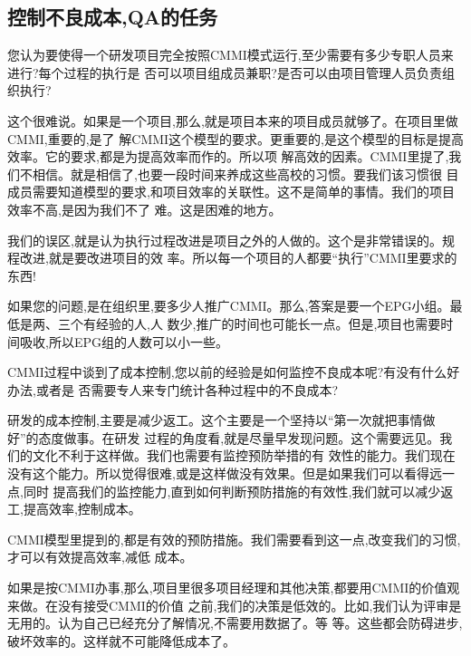 \documentclass[11pt]{article}
\begin{document}
\subsection{控制不良成本,QA的任务}
\qlogo \begin{staff}
您认为要使得一个研发项目完全按照CMMI模式运行,至少需要有多少专职人员来进行?每个过程的执行是
  否可以项目组成员兼职?是否可以由项目管理人员负责组织执行?
\end{staff}

\begin{yang}
  \ylogo 这个很难说。如果是一个项目,那么,就是项目本来的项目成员就够了。在项目里做CMMI,重要的,是了
  解CMMI这个模型的要求。更重要的,是这个模型的目标是提高效率。它的要求,都是为提高效率而作的。所以项
  解高效的因素。CMMI里提了,我们不相信。就是相信了,也要一段时间来养成这些高校的习惯。要我们该习惯很
  目成员需要知道模型的要求,和项目效率的关联性。这不是简单的事情。我们的项目效率不高,是因为我们不了
  难。这是困难的地方。

  我们的误区,就是认为执行过程改进是项目之外的人做的。这个是非常错误的。规程改进,就是要改进项目的效
  率。所以每一个项目的人都要``执行''CMMI里要求的东西!

  如果您的问题,是在组织里,要多少人推广CMMI。那么,答案是要一个EPG小组。最低是两、三个有经验的人,人
  数少,推广的时间也可能长一点。但是,项目也需要时间吸收,所以EPG组的人数可以小一些。
\end{yang}

\qlogo \begin{staff}
CMMI过程中谈到了成本控制,您以前的经验是如何监控不良成本呢?有没有什么好办法,或者是
否需要专人来专门统计各种过程中的不良成本?
\end{staff}

\begin{yang}
  \ylogo 研发的成本控制,主要是减少返工。这个主要是一个坚持以``第一次就把事情做好''的态度做事。在研发
  过程的角度看,就是尽量早发现问题。这个需要远见。我们的文化不利于这样做。我们也需要有监控预防举措的有
  效性的能力。我们现在没有这个能力。所以觉得很难,或是这样做没有效果。但是如果我们可以看得远一点,同时
  提高我们的监控能力,直到如何判断预防措施的有效性,我们就可以减少返工,提高效率,控制成本。

  CMMI模型里提到的,都是有效的预防措施。我们需要看到这一点,改变我们的习惯,才可以有效提高效率,减低
  成本。

  如果是按CMMI办事,那么,项目里很多项目经理和其他决策,都要用CMMI的价值观来做。在没有接受CMMI的价值
  之前,我们的决策是低效的。比如,我们认为评审是无用的。认为自己已经充分了解情况,不需要用数据了。等
  等。这些都会防碍进步,破坏效率的。这样就不可能降低成本了。
\end{yang}
\end{document}
